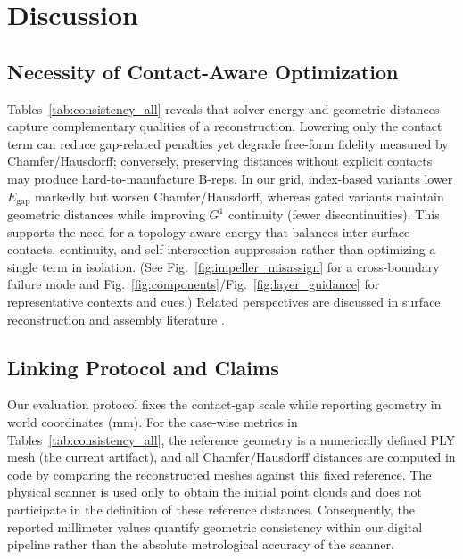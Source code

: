 \documentclass{ieeeaccess}
\begin{document}
\section{Discussion}
\label{sec:discussion}

\subsection{Necessity of Contact-Aware Optimization}
Tables~\ref{tab:consistency_all} reveals that solver energy and geometric
distances capture complementary qualities of a reconstruction.
Lowering only the contact term can reduce gap-related penalties
yet degrade free-form fidelity measured by Chamfer/Hausdorff;
conversely, preserving distances without explicit contacts may
produce hard-to-manufacture B-reps. In our grid, index-based
variants lower $E_{\text{gap}}$ markedly but worsen Chamfer/Hausdorff,
whereas gated variants maintain geometric distances while
improving $G^1$ continuity (fewer discontinuities). This supports
the need for a topology-aware energy that balances inter-surface
contacts, continuity, and self-intersection suppression rather than
optimizing a single term in isolation. (See Fig.~\ref{fig:impeller_misassign}
for a cross-boundary failure mode and Fig.~\ref{fig:components}/Fig.~\ref{fig:layer_guidance}
for representative contexts and cues.) Related perspectives are discussed in surface reconstruction and assembly literature \cite{b13,b14,b22}.

\subsection{Linking Protocol and Claims}
Our evaluation protocol fixes the contact-gap scale while reporting geometry in world coordinates (mm).
For the case-wise metrics in Tables~\ref{tab:consistency_all}, the reference geometry is a numerically defined PLY mesh (the current artifact), and all Chamfer/Hausdorff distances are computed in code by comparing the reconstructed meshes against this fixed reference.
The physical scanner is used only to obtain the initial point clouds and does not participate in the definition of these reference distances.
Consequently, the reported millimeter values quantify geometric consistency within our digital pipeline rather than the absolute metrological accuracy of the scanner.
\end{document}

